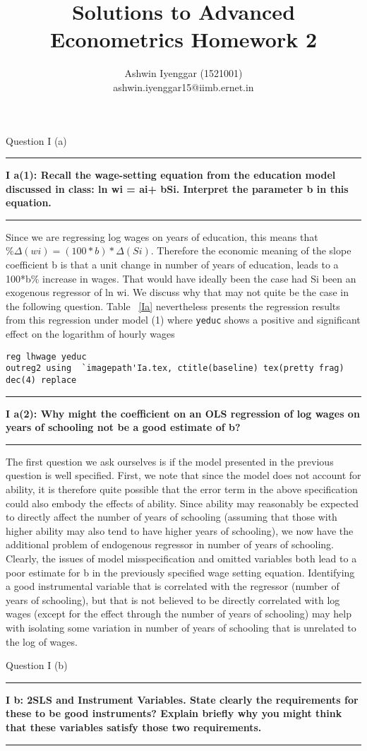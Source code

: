 \documentclass[12pt]{article}
\newcommand\question[2]{\vspace{1em}\hrule\vspace{1em}\textbf{#1: #2}\vspace{1em}\hrule\vspace{1em}}
\begin{document}
\title{Solutions to Advanced Econometrics Homework 2}
\author{Ashwin Iyenggar  (1521001) \\ ashwin.iyenggar15@iimb.ernet.in} 


\maketitle
\thispagestyle{empty}


\begin{center}\LARGE{Question I (a)}\end{center}

\question{I a(1)}{ Recall the wage-setting equation from the education model discussed in class: ln wi = ai+ bSi. Interpret the parameter b in this equation. }
Since we are regressing log wages on years of education, this means that $\%\Delta(wi) = (100*b)*\Delta(Si)$. Therefore the  economic meaning of the slope coefficient b is that a unit change in number of years of education, leads to a 100*b\% increase in wages. That would have ideally been the case had Si been an exogenous regressor of ln wi. We discuss why that may not quite be the case in the following question. Table ~\ref{Ia} nevertheless presents the regression  results from this regression under model (1) where \verb|yeduc| shows a positive and significant effect on the logarithm of hourly wages
\begin{lstlisting}
reg lhwage yeduc
outreg2 using  `imagepath'Ia.tex, ctitle(baseline) tex(pretty frag) dec(4) replace
\end{lstlisting}



\question{I a(2)}{ Why might the coefficient on an OLS  regression of log wages on years of schooling not be a good estimate of b?}
The first question we ask ourselves is if the model presented in the previous question is well specified. First, we note that since the model does not account for ability, it is therefore quite possible that the error term in the above specification could also embody the effects of ability. Since ability may reasonably be expected to directly affect the number of years of schooling (assuming that those with higher ability may also tend to have higher years of schooling), we now have the additional problem of endogenous regressor in number of years of schooling. Clearly, the issues of model misspecification and omitted variables both lead to a poor estimate for b in the previously specified wage setting equation. Identifying a good instrumental variable that is correlated with the regressor (number of years of schooling), but that is not believed to be directly correlated with log wages (except for the effect through the number of years of schooling) may help with isolating some variation in number of years of schooling that is unrelated to the log of wages.
\newpage
\begin{center}\LARGE{Question I (b)}\end{center}
\question{I b}{2SLS and Instrument Variables.  State clearly the requirements for these to be good instruments? Explain briefly why you might think that these variables satisfy those two requirements.}
\end{document}

